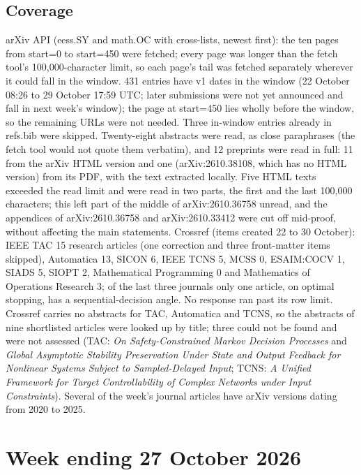 \documentclass[11pt,a4paper]{article}
\begin{document}
\subsection*{Coverage}
arXiv API (eess.SY and math.OC with cross-lists, newest first): the ten pages from start=0 to start=450 were fetched; every page was longer than the fetch tool's 100{,}000-character limit, so each page's tail was fetched separately wherever it could fall in the window. 431 entries have v1 dates in the window (22 October 08:26 to 29 October 17:59 UTC; later submissions were not yet announced and fall in next week's window); the page at start=450 lies wholly before the window, so the remaining URLs were not needed. Three in-window entries already in refs.bib were skipped. Twenty-eight abstracts were read, as close paraphrases (the fetch tool would not quote them verbatim), and 12 preprints were read in full: 11 from the arXiv HTML version and one (arXiv:2610.38108, which has no HTML version) from its PDF, with the text extracted locally. Five HTML texts exceeded the read limit and were read in two parts, the first and the last 100{,}000 characters; this left part of the middle of arXiv:2610.36758 unread, and the appendices of arXiv:2610.36758 and arXiv:2610.33412 were cut off mid-proof, without affecting the main statements. Crossref (items created 22 to 30 October): IEEE TAC 15 research articles (one correction and three front-matter items skipped), Automatica 13, SICON 6, IEEE TCNS 5, MCSS 0, ESAIM:COCV 1, SIADS 5, SIOPT 2, Mathematical Programming 0 and Mathematics of Operations Research 3; of the last three journals only one article, on optimal stopping, has a sequential-decision angle. No response ran past its row limit. Crossref carries no abstracts for TAC, Automatica and TCNS, so the abstracts of nine shortlisted articles were looked up by title; three could not be found and were not assessed (TAC: \emph{On Safety-Constrained Markov Decision Processes} and \emph{Global Asymptotic Stability Preservation Under State and Output Feedback for Nonlinear Systems Subject to Sampled-Delayed Input}; TCNS: \emph{A Unified Framework for Target Controllability of Complex Networks under Input Constraints}). Several of the week's journal articles have arXiv versions dating from 2020 to 2025.

\section{Week ending 27 October 2026}
\label{week:2026-10-27}
\end{document}
